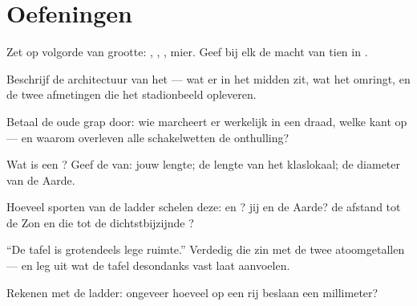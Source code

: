 \section{Oefeningen}

\begin{exercise}[$\star$]\label{exo:g9:atoms-to-galaxies:1}
Zet op volgorde van grootte: , ,
, mier. Geef bij elk de macht van tien in
.
\end{exercise}

\begin{exercise}[$\star$]\label{exo:g9:atoms-to-galaxies:2}
Beschrijf de architectuur van het  --- wat er in het midden
zit, wat het omringt, en de twee afmetingen die het stadionbeeld
opleveren.
\end{exercise}

\begin{exercise}[$\star$]\label{exo:g9:atoms-to-galaxies:3}
Betaal de oude grap door: wie marcheert er werkelijk in een draad,
welke kant op --- en waarom overleven alle schakelwetten de onthulling?
\end{exercise}

\begin{exercise}[$\star$]\label{exo:g9:atoms-to-galaxies:4}
Wat is een ? Geef de  van:
jouw lengte; de lengte van het klaslokaal; de diameter van de Aarde.
\end{exercise}

\begin{exercise}[$\star$]\label{exo:g9:atoms-to-galaxies:5}
Hoeveel sporten van de ladder schelen deze:  en
? jij en de Aarde? de afstand tot de Zon en die tot de
dichtstbijzijnde ?
\end{exercise}

\begin{exercise}[$\star$]\label{exo:g9:atoms-to-galaxies:6}
``De tafel is grotendeels lege ruimte.'' Verdedig die zin met de twee
atoomgetallen --- en leg uit wat de tafel desondanks
vast laat aanvoelen.
\end{exercise}

\begin{exercise}[$\star$]\label{exo:g9:atoms-to-galaxies:7}
Rekenen met de ladder: ongeveer hoeveel  op een rij
beslaan een millimeter?
\end{exercise}

